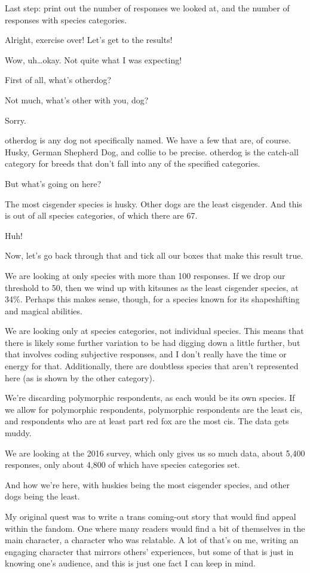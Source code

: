 Last step: print out the number of responses we looked at, and the number of responses with species categories.

Alright, exercise over! Let's get to the results!

Wow, uh\ldots{}okay. Not quite what I was expecting!

First of all, what's otherdog?

Not much, what's other with you, dog?

Sorry.

otherdog is any dog not specifically named. We have a few that are, of course. Husky, German Shepherd Dog, and collie to be precise. otherdog is the catch-all category for breeds that don't fall into any of the specified categories.

But what's going on here?

The most cisgender species is husky. Other dogs are the least cisgender. And this is out of all species categories, of which there are 67.

Huh!

Now, let's go back through that and tick all our boxes that make this result true.

We are looking at only species with more than 100 responses. If we drop our threshold to 50, then we wind up with kitsunes as the least cisgender species, at 34\%. Perhaps this makes sense, though, for a species known for its shapeshifting and magical abilities.

We are looking only at species categories, not individual species. This means that there is likely some further variation to be had digging down a little further, but that involves coding subjective responses, and I don't really have the time or energy for that. Additionally, there are doubtless species that aren't represented here (as is shown by the other category).

We're discarding polymorphic respondents, as each would be its own species. If we allow for polymorphic respondents, polymorphic respondents are the least cis, and respondents who are at least part red fox are the most cis. The data gets muddy.

We are looking at the 2016 survey, which only gives us so much data, about 5,400 responses, only about 4,800 of which have species categories set.

And how we're here, with huskies being the most cisgender species, and other dogs being the least.

My original quest was to write a trans coming-out story that would find appeal within the fandom. One where many readers would find a bit of themselves in the main character, a character who was relatable. A lot of that's on me, writing an engaging character that mirrors others' experiences, but some of that is just in knowing one's audience, and this is just one fact I can keep in mind.

